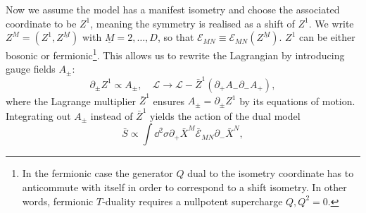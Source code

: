 \par Now we assume the model has a manifest isometry and choose the associated
coordinate to be $Z^1$, meaning the symmetry is realised as a shift of $Z^1$.
We write $Z^M = (Z^1, Z^{\underline{M}})$ with $\underline{M} = 2,\dots,D$, so
that $\mathcal{E}_{MN} \equiv \mathcal{E}_{MN}(Z^{\underline{M}})$. $Z^1$ can
be either bosonic or fermionic\footnote{In the fermionic case the generator $Q$
  dual to the isometry coordinate has to anticommute with itself in order to
  correspond to a shift isometry. In other words, fermionic $T$-duality
requires a nullpotent supercharge $Q, Q^2=0$.}. This allows us to rewrite the
Lagrangian by introducing gauge fields $A_{\pm}$:
\begin{equation}
  \partial_{\pm}Z^1 \propto A_{\pm},\quad
  \mathcal{L}\rightarrow\mathcal{L}-\bar{Z}^1(\partial_+A_ - \partial_-A_+),
\end{equation}
where the Lagrange multiplier $\bar{Z}^1$ ensures $A_{\pm} = \partial_{\pm}Z^1$
by its equations of motion. Integrating out $A_{\pm}$ instead of $\bar{Z}^1$
yields the action of the dual model
\begin{equation}
  \bar{S}\propto\int\dd^2\sigma\partial_+\bar{X}^M\bar{\mathcal{E}}_{MN}\partial_-\bar{X}^N,
\end{equation}
